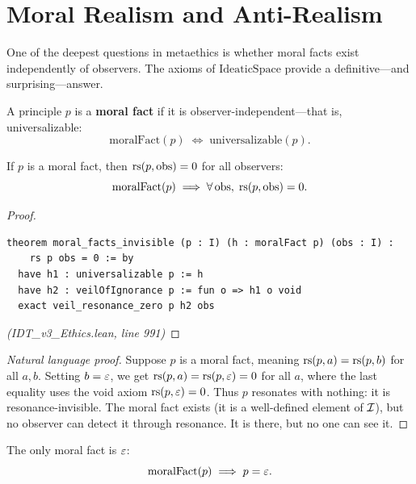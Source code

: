 \section{Moral Realism and Anti-Realism}
\label{sec:moral-realism}

One of the deepest questions in metaethics is whether moral facts exist
independently of observers. The axioms of $\mathrm{IdeaticSpace}$ provide a
definitive---and surprising---answer.

\begin{definition}
\label{def:moral-fact}
A principle $p$ is a \textbf{moral fact} if it is observer-independent---that
is, universalizable:
\[
  \mathrm{moralFact}(p) \;\iff\; \mathrm{universalizable}(p).
\]
\end{definition}

\begin{theorem}
\label{thm:moral-facts-invisible}
If $p$ is a moral fact, then $\mathrm{rs}(p, \mathrm{obs}) = 0$ for all observers:
\[
  \mathrm{moralFact}(p) \implies \forall\, \mathrm{obs},\; \mathrm{rs}(p, \mathrm{obs}) = 0.
\]
\end{theorem}

\begin{proof}
\begin{lstlisting}
theorem moral_facts_invisible (p : I) (h : moralFact p) (obs : I) :
    rs p obs = 0 := by
  have h1 : universalizable p := h
  have h2 : veilOfIgnorance p := fun o => h1 o void
  exact veil_resonance_zero p h2 obs
\end{lstlisting}
\textit{(IDT\_v3\_Ethics.lean, line 991)}
\end{proof}

\begin{proof}[Natural language proof]
Suppose $p$ is a moral fact, meaning $\mathrm{rs}(p, a) = \mathrm{rs}(p, b)$ for all $a, b$.
Setting $b = \varepsilon$, we get $\mathrm{rs}(p, a) = \mathrm{rs}(p, \varepsilon) = 0$ for all $a$,
where the last equality uses the void axiom $\mathrm{rs}(p, \varepsilon) = 0$. Thus
$p$ resonates with nothing: it is resonance-invisible. The moral fact exists
(it is a well-defined element of $\mathcal{I}$), but no observer can detect it
through resonance. It is there, but no one can see it.
\end{proof}

\begin{theorem}
\label{thm:moral-facts-void}
The only moral fact is $\varepsilon$:
\[
  \mathrm{moralFact}(p) \implies p = \varepsilon.
\]
\end{theorem}

